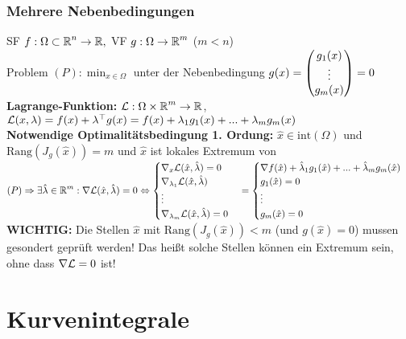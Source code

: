 \documentclass[german]{latex4ei/latex4ei_sheet}
\begin{document}
\subsubsection{Mehrere Nebenbedingungen}
SF $f: \Omega \subset \operatorname{\mathbb R}^n \to \operatorname{\mathbb R},$ VF $g:\Omega \to \operatorname{\mathbb R}^m$ ($m<n$)\\
Problem $(P): \min_{x\in \Omega}$ unter der Nebenbedingung $g(x)=\begin{pmatrix} g_1(x)\\\vdots\\g_m(x) \end{pmatrix}=0$\\
\textbf{Lagrange-Funktion:} $\mathcal{L}:\Omega \times \operatorname{\mathbb R}^m \to \operatorname{\mathbb R}$, $\mathcal{L}(x,\lambda)=f(x)+\lambda^\top g(x)=f(x)+\lambda_1 g_1(x)+...+\lambda_m g_m(x)$\\
\textbf{Notwendige Optimalit\"atsbedingung 1. Ordung:} $\hat{x}\in \mathrm{int}(\Omega) $ und $\mathrm{Rang}(J_g(\hat{x}))=m$ und $\hat{x}$ ist lokales Extremum von $(P) \Rightarrow \exists \hat{\lambda} \in \operatorname{\mathbb R}^m: \nabla \mathcal{L}(\hat{x},\hat{\lambda})=0 \Leftrightarrow \begin{cases} \nabla_x \mathcal{L} (\hat{x},\hat{\lambda})=0 \\ \nabla_{\lambda_1} \mathcal{L}(\hat{x},\hat{\lambda}) \\ \vdots \\ \nabla_{\lambda_m} \mathcal{L} (\hat{x},\hat{\lambda})=0 \end{cases}=\begin{cases}  \nabla f(\hat{x})+\hat{\lambda}_1 g_1(\hat{x}) + ... + \hat{\lambda}_m g_m(\hat{x}) \\ g_1(\hat{x})=0 \\ \vdots \\ g_m(\hat{x})=0 \end{cases}$ \\
\textbf{WICHTIG:} Die Stellen $\hat{x}$ mit $\mathrm{Rang}(J_g(\hat{x}))<m$ (und $g(\hat{x})=0$) m\:ussen gesondert gepr\"uft werden! Das hei\ss{}t solche Stellen k\"onnen ein Extremum sein, ohne dass $\nabla \mathcal{L} =0$ ist!

\section{Kurvenintegrale}
\end{document}
